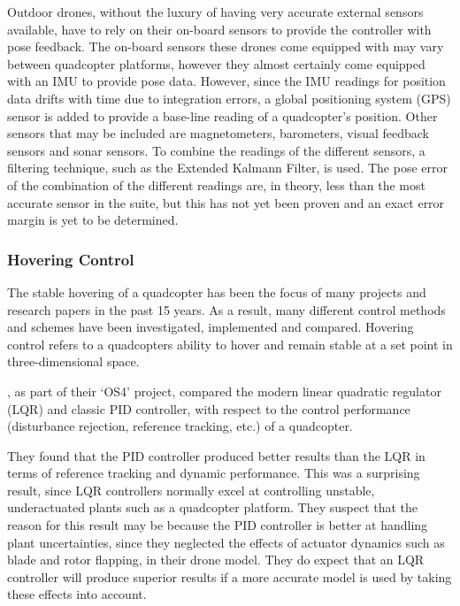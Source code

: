 Outdoor drones, without the luxury of having very accurate external sensors available, have to rely on their on-board sensors to provide the controller with pose feedback. The on-board sensors these drones come equipped with may vary between quadcopter platforms, however they almost certainly come equipped with an IMU to provide pose data. However, since the IMU readings for position data drifts with time due to integration errors, a global positioning system (GPS) sensor is added to provide a base-line reading of a quadcopter's position. Other sensors that may be included are magnetometers, barometers, visual feedback sensors and sonar sensors. To combine the readings of the different sensors, a filtering technique, such as the Extended Kalmann Filter, is used. The pose error of the combination of the different readings are, in theory, less than the most accurate sensor in the suite, but this has not yet been proven and an exact error margin is yet to be determined. 

\subsubsection{Hovering Control}

The stable hovering of a quadcopter has been the focus of many projects and research papers in the past 15 years. As a result, many different control methods and schemes have been investigated, implemented and compared. Hovering control refers to a quadcopters ability to hover and remain stable at a set point in three-dimensional space.

\cite{bouabdallah2004pid}, as part of their `OS4' project, compared the modern linear quadratic regulator (LQR) and classic PID controller, with respect to the control performance (disturbance rejection, reference tracking, etc.) of a quadcopter.

They found that the PID controller produced better results than the LQR in terms of reference tracking and dynamic performance. This was a surprising result, since LQR controllers normally excel at controlling unstable, underactuated plants such as a quadcopter platform. They suspect that the reason for this result may be because the PID controller is better at handling plant uncertainties, since they neglected the effects of actuator dynamics such as blade and rotor flapping, in their drone model. They do expect that an LQR controller will produce superior results if a more accurate model is used by taking these effects into account. 

